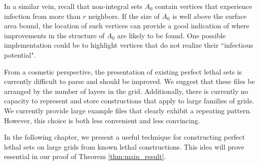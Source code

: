 In a similar vein, recall that non-integral sets $A_0$ contain vertices that experience infection from more than $r$ neighbors. If the size of $A_0$ is well above the surface area bound, the location of such vertices can provide a good indication of where improvements in the structure of $A_0$ are likely to be found. One possible implementation could be to highlight vertices that do not realize their ``infectious potential". 

From a cosmetic perspective, the presentation of existing perfect lethal sets is currently difficult to parse and should be improved. We suggest that these files be arranged by the number of layers in the grid. Additionally, there is currently no capacity to represent and store constructions that apply to large families of grids. We currently provide large example files that clearly exhibit a repeating pattern. However, this choice is both less convenient and less convincing. 






In the following chapter, we present a useful technique for constructing perfect lethal sets on large grids from known lethal constructions. This idea will prove essential in our proof of Theorem \ref{thm:main_result}. 


